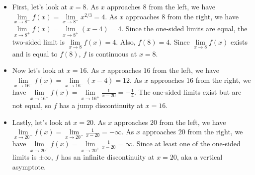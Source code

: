 \documentclass{article}
\begin{document}
\begin{enumerate}[resume]
\begin{solution}
    \begin{itemize}

    \item
    First, let's look at $x=8$. As $x$ approaches $8$ from the left, we have
    $\lim\limits_{x \to 8^-} f(x) = \lim\limits_{x \to 8^-} x^{2/3} = 4$. 
    As $x$ approaches $8$ from the right,
    we have $\lim\limits_{x \to 8^+} f(x) =\lim\limits_{x \to 8^+} (x-4) = 4$.
    Since the one-sided limits are equal, the two-sided limit is 
    $\lim\limits_{x \to 8} f(x) =4$. Also, $f(8) = 4$. Since 
    $\lim\limits_{x \to 8} f(x)$ exists and is equal to $f(8)$, $f$ is continuous
    at $x=8$. 
    
    \item
    Now let's look at $x=16$. As $x$ approaches $16$ from the left, we have
    $\lim\limits_{x \to 16^-} f(x) = \lim\limits_{x \to 16^-} (x-4) = 12$. 
    As $x$ approaches $16$ from the right,
    we have $\lim\limits_{x \to 16^+} f(x) =\lim\limits_{x \to 16^+} \frac{1}{x-20}=
    -\frac{1}{4}$. The one-sided limits exist but are not equal, so $f$ has a jump
    discontinuity at $x=16$.

    \item
    Lastly, let's look at $x=20$. As $x$ approaches $20$ from the left, we have
    $\lim\limits_{x \to 20^-} f(x) = \lim\limits_{x \to 20^-} \frac{1}{x-20} = -\infty$. 
    As $x$ approaches $20$ from the right,
    we have $\lim\limits_{x \to 20^+} f(x) =\lim\limits_{x \to 20^+} \frac{1}{x-20}=
    \infty$. Since at least one of the one-sided limits is $\pm \infty$, $f$ has an infinite
    discontinuity at $x=20$, aka a vertical asymptote. 

    \end{itemize}
    
  \end{solution}

\end{enumerate}
\end{document}
